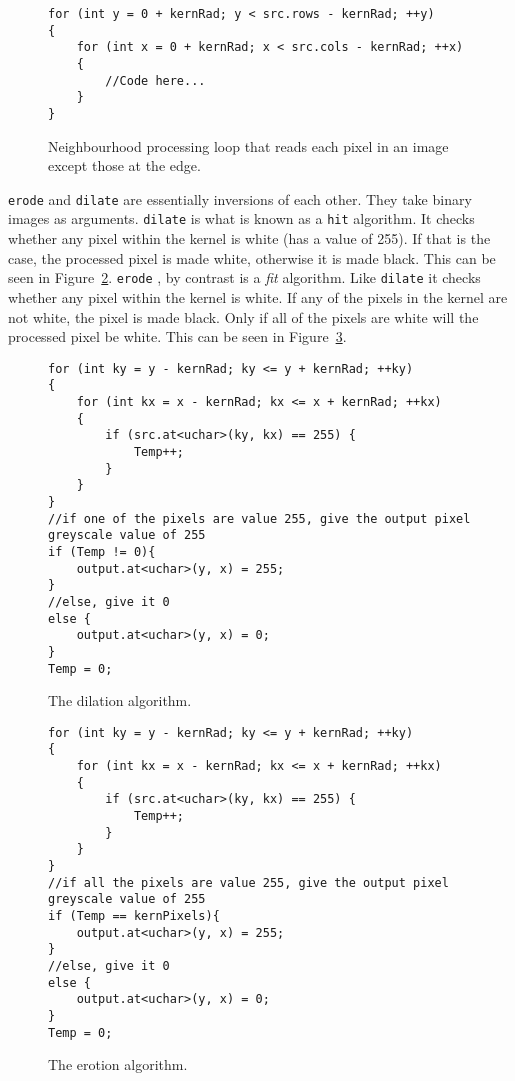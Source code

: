 \begin{figure}
\begin{lstlisting}
for (int y = 0 + kernRad; y < src.rows - kernRad; ++y)
{
	for (int x = 0 + kernRad; x < src.cols - kernRad; ++x)
	{
		//Code here...
	}
}
\end{lstlisting}
\caption{Neighbourhood processing loop that reads each pixel in an image except those at the edge. \label{fig:neighbourhoodForLoop}}
\end{figure}

\texttt{erode} and \texttt{dilate} are essentially inversions of each other. They take binary images as arguments. \texttt{dilate} is what is known as a \texttt{hit} algorithm. It checks whether any pixel within the kernel is white (has a value of 255). If that is the case, the processed pixel is made white, otherwise it is made black. This can be seen in Figure~\ref{fig:dilateAlgorith}. \texttt{erode} , by contrast is a \textit{fit} algorithm. Like \texttt{dilate} it checks whether any pixel within the kernel is white. If any of the pixels in the kernel are not white, the pixel is made black. Only if all of the pixels are white will the processed pixel be white. This can be seen in Figure~\ref{fig:erodeAlgorithm}.

\begin{figure}
\begin{lstlisting}
for (int ky = y - kernRad; ky <= y + kernRad; ++ky)
{
	for (int kx = x - kernRad; kx <= x + kernRad; ++kx)
	{
		if (src.at<uchar>(ky, kx) == 255) {
			Temp++;
		}
	}
}
//if one of the pixels are value 255, give the output pixel greyscale value of 255
if (Temp != 0){
	output.at<uchar>(y, x) = 255;
}
//else, give it 0
else {
	output.at<uchar>(y, x) = 0;
}
Temp = 0;
\end{lstlisting}
\caption{The dilation algorithm. \label{fig:dilateAlgorith}}
\end{figure}

\begin{figure}
\begin{lstlisting}
for (int ky = y - kernRad; ky <= y + kernRad; ++ky)
{
	for (int kx = x - kernRad; kx <= x + kernRad; ++kx)
	{
		if (src.at<uchar>(ky, kx) == 255) {
			Temp++;
		}
	}
}
//if all the pixels are value 255, give the output pixel greyscale value of 255
if (Temp == kernPixels){
	output.at<uchar>(y, x) = 255;
}
//else, give it 0
else {
	output.at<uchar>(y, x) = 0;
}
Temp = 0;
\end{lstlisting}
\caption{The erotion algorithm.\label{fig:erodeAlgorithm}}
\end{figure}

